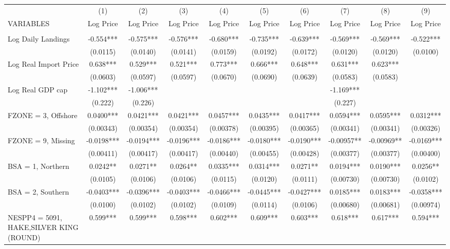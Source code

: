 \begin{tabular}{lccccccccc} \hline
 & (1) & (2) & (3) & (4) & (5) & (6) & (7) & (8) & (9) \\
VARIABLES & Log Price & Log Price & Log Price & Log Price & Log Price & Log Price & Log Price & Log Price & Log Price \\ \hline
 &  &  &  &  &  &  &  &  &  \\
Log Daily Landings & -0.554*** & -0.575*** & -0.576*** & -0.680*** & -0.735*** & -0.639*** & -0.569*** & -0.569*** & -0.522*** \\
 & (0.0115) & (0.0140) & (0.0141) & (0.0159) & (0.0192) & (0.0172) & (0.0120) & (0.0120) & (0.0100) \\
Log Real Import Price & 0.638*** & 0.529*** & 0.521*** & 0.773*** & 0.666*** & 0.648*** & 0.631*** & 0.623*** &  \\
 & (0.0603) & (0.0597) & (0.0597) & (0.0670) & (0.0690) & (0.0639) & (0.0583) & (0.0583) &  \\
Log Real GDP cap & -1.102*** & -1.006*** &  &  &  &  & -1.169*** &  &  \\
 & (0.222) & (0.226) &  &  &  &  & (0.227) &  &  \\
FZONE = 3, Offshore & 0.0400*** & 0.0421*** & 0.0421*** & 0.0457*** & 0.0435*** & 0.0417*** & 0.0594*** & 0.0595*** & 0.0312*** \\
 & (0.00343) & (0.00354) & (0.00354) & (0.00378) & (0.00395) & (0.00365) & (0.00341) & (0.00341) & (0.00326) \\
FZONE = 9, Missing & -0.0198*** & -0.0194*** & -0.0196*** & -0.0186*** & -0.0180*** & -0.0190*** & -0.00957** & -0.00969** & -0.0169*** \\
 & (0.00411) & (0.00417) & (0.00417) & (0.00440) & (0.00455) & (0.00428) & (0.00377) & (0.00377) & (0.00400) \\
BSA = 1, Northern & 0.0242** & 0.0271** & 0.0264** & 0.0335*** & 0.0314*** & 0.0271** & 0.0194*** & 0.0190*** & 0.0256** \\
 & (0.0105) & (0.0106) & (0.0106) & (0.0115) & (0.0120) & (0.0111) & (0.00730) & (0.00730) & (0.0102) \\
BSA = 2, Southern & -0.0403*** & -0.0396*** & -0.0403*** & -0.0466*** & -0.0445*** & -0.0427*** & 0.0185*** & 0.0183*** & -0.0358*** \\
 & (0.0100) & (0.0102) & (0.0102) & (0.0109) & (0.0114) & (0.0106) & (0.00680) & (0.00681) & (0.00974) \\
NESPP4 = 5091, HAKE,SILVER KING (ROUND) & 0.599*** & 0.599*** & 0.598*** & 0.602*** & 0.609*** & 0.603*** & 0.618*** & 0.617*** & 0.594*** \\

\end{tabular}
